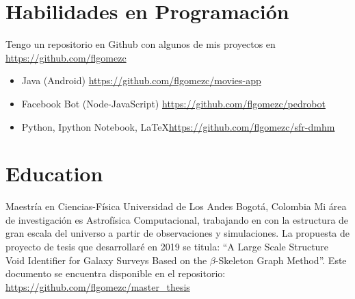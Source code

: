\documentclass[12pt,letterpaper,sans]{moderncv}
\begin{document}

\section{Habilidades en Programación}

Tengo un repositorio en Github con algunos de mis proyectos en \url{https://github.com/flgomezc}
\medskip

\begin{itemize}
\item Java (Android) \url{https://github.com/flgomezc/movies-app}
\item Facebook Bot (Node-JavaScript) \url{https://github.com/flgomezc/pedrobot}
\item Python, Ipython Notebook, \LaTeX \url{https://github.com/flgomezc/sfr-dmhm}
\end{itemize}

\medskip




\section{Education}


        {Maestría en Ciencias-Física}
        {Universidad de Los Andes}
        {Bogot\'a, Colombia}{}
        {Mi área de investigación es Astrofísica Computacional, trabajando en con la
          estructura de gran escala del universo a partir de observaciones y simulaciones.
          La propuesta de proyecto de tesis que desarrollaré en 2019 se titula:
          ``A Large Scale Structure Void Identifier for Galaxy Surveys Based on the
          $\beta$-Skeleton Graph Method''. Este documento se encuentra disponible en el
          repositorio: \url{https://github.com/flgomezc/master_thesis}
        }
\end{document}
